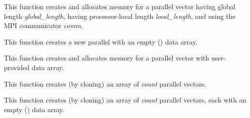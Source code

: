 \documentclass[letterpaper,10pt,english]{sphinxmanual}
\begin{document}
\begin{fulllineitems}
\label{nvectors/NVector_Parallel:c.N_VNew_Parallel}
This function creates and allocates memory for a parallel vector
having global length \emph{global\_length}, having processor-local length
\emph{local\_length}, and using the MPI communicator \emph{comm}.

\end{fulllineitems}


\begin{fulllineitems}
\label{nvectors/NVector_Parallel:c.N_VNewEmpty_Parallel}
This function creates a new parallel  with an empty
() data array.

\end{fulllineitems}


\begin{fulllineitems}
\label{nvectors/NVector_Parallel:c.N_VMake_Parallel}
This function creates and allocates memory for a parallel vector
with user-provided data array.

\end{fulllineitems}


\begin{fulllineitems}
\label{nvectors/NVector_Parallel:c.N_VCloneVectorArray_Parallel}
This function creates (by cloning) an array of \emph{count} parallel vectors.

\end{fulllineitems}


\begin{fulllineitems}
\label{nvectors/NVector_Parallel:c.N_VCloneEmptyVectorArray_Parallel}
This function creates (by cloning) an array of \emph{count} parallel
vectors, each with an empty () data array.

\end{fulllineitems}
\end{document}
